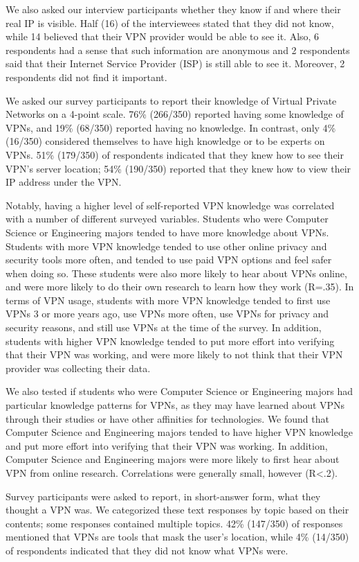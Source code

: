 We also asked our interview participants whether they know if and where their real IP is visible. Half (16) of the interviewees stated that they did not know, while 14 believed that their VPN provider would be able to see it. Also, 6 respondents had a sense that such information are anonymous and 2 respondents said that their Internet Service Provider (ISP) is still able to see it. Moreover, 2 respondents did not find it important.

We asked our survey participants to report their knowledge of Virtual Private Networks on a 4-point scale. 76\% (266/350) reported having some knowledge of VPNs, and 19\% (68/350) reported having no knowledge. In contrast, only 4\% (16/350) considered themselves to have high knowledge or to be experts on VPNs. 51\% (179/350) of respondents indicated that they knew how to see their VPN’s server location; 54\% (190/350) reported that they knew how to view their IP address under the VPN.

Notably, having a higher level of self-reported VPN knowledge was correlated with a number of different surveyed variables. Students who were Computer Science or Engineering majors tended to have more knowledge about VPNs. Students with more VPN knowledge tended to use other online privacy and security tools more often, and tended to use paid VPN options and feel safer when doing so. These students were also more likely to hear about VPNs online, and were more likely to do their own research to learn how they work (R=.35). In terms of VPN usage, students with more VPN knowledge tended to first use VPNs 3 or more years ago, use VPNs more often, use VPNs for privacy and security reasons, and still use VPNs at the time of the survey. In addition, students with higher VPN knowledge tended to put more effort into verifying that their VPN was working, and were more likely to not think that their VPN provider was collecting their data.

We also tested if students who were Computer Science or Engineering majors had particular knowledge patterns for VPNs, as they may have learned about VPNs through their studies or have other affinities for technologies. We found that Computer Science and Engineering majors tended to have higher VPN knowledge and put more effort into verifying that their VPN was working. In addition, Computer Science and Engineering majors were more likely to first hear about VPN from online research. Correlations were generally small, however (R<.2).

Survey participants were asked to report, in short-answer form, what they thought a VPN was. We categorized these text responses by topic based on their contents; some responses contained multiple topics. 42\% (147/350) of responses mentioned that VPNs are tools that mask the user’s location, while 4\% (14/350) of respondents indicated that they did not know what VPNs were.

